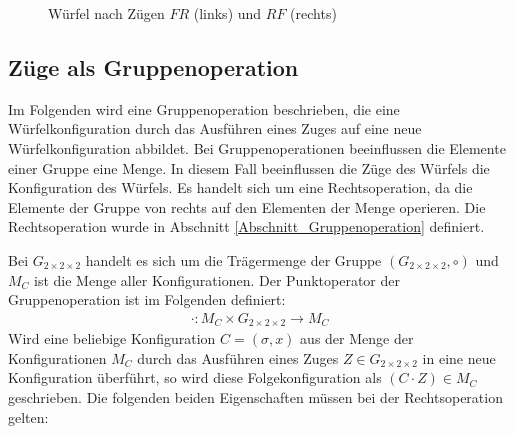 \documentclass[12pt,a4paper, usenames, dvipsnames]{article}
\theoremstyle{mystyle}
\theoremstyle{definition}
\newcommand{\Gtwo}{\ensuremath{G_{2\times 2\times 2}}}
\begin{document}
\begin{figure}[H]
\caption[Würfel nach Zügen $FR$ (links) und $RF$ (rechts)]{Würfel nach Zügen $FR$ (links) und $RF$ (rechts)}
\label{Abbildung_WürfelNachFRundRF}
\end{figure}

%
%
%
%
%
%
%
%
%
%
%
%
%
%
%
%
%
%
%
%
\subsection{Züge als Gruppenoperation}

Im Folgenden wird eine Gruppenoperation beschrieben, die eine Würfelkonfiguration durch das Ausführen eines Zuges auf eine neue Würfelkonfiguration abbildet. Bei Gruppenoperationen beeinflussen die Elemente einer Gruppe eine Menge. In diesem Fall beeinflussen die Züge des Würfels die Konfiguration des Würfels. Es handelt sich um eine Rechtsoperation, da die Elemente der Gruppe von rechts auf den Elementen der Menge operieren. Die Rechtsoperation wurde in Abschnitt \ref{Abschnitt_Gruppenoperation} definiert.

Bei $\Gtwo$ handelt es sich um die Trägermenge der Gruppe $(\Gtwo, \circ)$ und $M_C$ ist die Menge aller Konfigurationen. Der Punktoperator der Gruppenoperation ist im Folgenden definiert:
\begin{align*}
\cdot: M_C \times \Gtwo \rightarrow M_C
\end{align*} 
Wird eine beliebige Konfiguration $C=(\sigma, x)$ aus der Menge der Konfigurationen $M_C$ durch das Ausführen eines Zuges $Z \in \Gtwo$ in eine neue Konfiguration überführt, so wird diese Folgekonfiguration als $(C \cdot Z) \in M_C$ geschrieben.
Die folgenden beiden Eigenschaften müssen bei der Rechtsoperation gelten:
\end{document}
